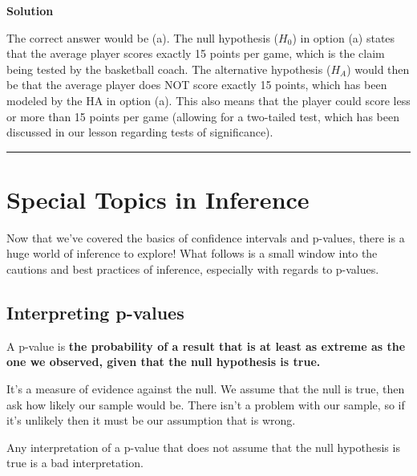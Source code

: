 \documentclass[
  letterpaper,
  DIV=11,
  numbers=noendperiod,
  oneside]{scrreprt}
\begin{document}
\textbf{Solution}

The correct answer would be (a). The null hypothesis (\(H_0\)) in option
(a) states that the average player scores exactly 15 points per game,
which is the claim being tested by the basketball coach. The alternative
hypothesis (\(H_A\)) would then be that the average player does NOT
score exactly 15 points, which has been modeled by the HA in option (a).
This also means that the player could score less or more than 15 points
per game (allowing for a two-tailed test, which has been discussed in
our lesson regarding tests of significance).

\begin{center}\rule{0.5\linewidth}{0.5pt}\end{center}

\hypertarget{special-topics-in-inference}{%
\chapter{Special Topics in
Inference}\label{special-topics-in-inference}}

Now that we've covered the basics of confidence intervals and p-values,
there is a huge world of inference to explore! What follows is a small
window into the cautions and best practices of inference, especially
with regards to p-values.

\hypertarget{interpreting-p-values}{%
\section{Interpreting p-values}\label{interpreting-p-values}}

A p-value is \textbf{the probability of a result that is at least as
extreme as the one we observed, given that the null hypothesis is true.}

It's a measure of evidence against the null. We assume that the null is
true, then ask how likely our sample would be. There isn't a problem
with our sample, so if it's unlikely then it must be our assumption that
is wrong.

\begin{tcolorbox}[enhanced jigsaw, toprule=.15mm, colbacktitle=quarto-callout-important-color!10!white, title=\textcolor{quarto-callout-important-color}{\faExclamation}\hspace{0.5em}{``Given that the null hypothesis is true''}, arc=.35mm, colframe=quarto-callout-important-color-frame, colback=white, titlerule=0mm, left=2mm, bottomtitle=1mm, bottomrule=.15mm, breakable, opacitybacktitle=0.6, leftrule=.75mm, toptitle=1mm, coltitle=black, rightrule=.15mm, opacityback=0]

Any interpretation of a p-value that does not assume that the null
hypothesis is true is a bad interpretation.

\end{tcolorbox}
\end{document}
